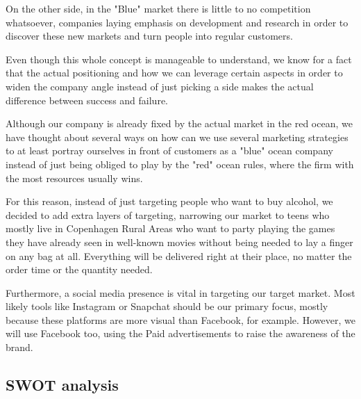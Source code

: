 \documentclass[12p]{article}
\begin{document}
On the other side, in the "Blue" market there is little to no competition whatsoever, companies laying emphasis on development and research in order to discover these new markets and turn people into regular customers.

Even though this whole concept is manageable to understand, we know for a fact that the actual positioning and how we can leverage certain aspects in order to widen the company angle instead of just picking a side makes the actual difference between success and failure.

Although our company is already fixed by the actual market in the red ocean, we have thought about several ways on how can we use several marketing strategies to at least portray ourselves in front of customers as a "blue" ocean company instead of just being obliged to play by the "red" ocean rules, where the firm with the most resources usually wins.

For this reason, instead of just targeting people who want to buy alcohol, we decided to add extra layers of targeting, narrowing our market to teens who mostly live in Copenhagen Rural Areas who want to party playing the games they have already seen in well-known movies without being needed to lay a finger on any bag at all. Everything will be delivered right at their place, no matter the order time or the quantity needed.

Furthermore, a social media presence is vital in targeting our target market. Most likely tools like Instagram or Snapchat should be our primary focus, mostly because these platforms are more visual than Facebook, for example. However, we will use Facebook too, using the Paid advertisements to raise the awareness of the brand.


\subsection{SWOT analysis} \label{SWOT}
\end{document}
